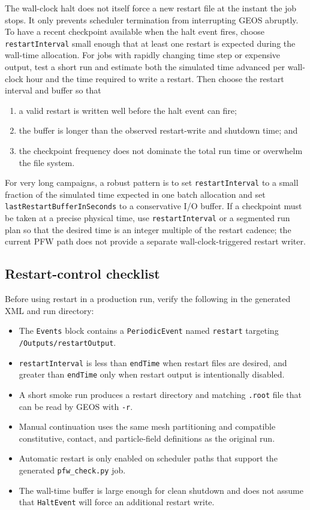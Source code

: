 The wall-clock halt does not itself force a new restart file at the instant the job stops.  It only prevents scheduler termination from interrupting GEOS abruptly.  To have a recent checkpoint available when the halt event fires, choose \texttt{restartInterval} small enough that at least one restart is expected during the wall-time allocation.  For jobs with rapidly changing time step or expensive output, test a short run and estimate both the simulated time advanced per wall-clock hour and the time required to write a restart.  Then choose the restart interval and buffer so that
\begin{enumerate}[leftmargin=*]
\item a valid restart is written well before the halt event can fire;
\item the buffer is longer than the observed restart-write and shutdown time; and
\item the checkpoint frequency does not dominate the total run time or overwhelm the file system.
\end{enumerate}

For very long campaigns, a robust pattern is to set \texttt{restartInterval} to a small fraction of the simulated time expected in one batch allocation and set \texttt{lastRestartBufferInSeconds} to a conservative I/O buffer.  If a checkpoint must be taken at a precise physical time, use \texttt{restartInterval} or a segmented run plan so that the desired time is an integer multiple of the restart cadence; the current PFW path does not provide a separate wall-clock-triggered restart writer.

\subsection{Restart-control checklist}
\label{sec:pfw-restart-checklist}

Before using restart in a production run, verify the following in the generated XML and run directory:
\begin{itemize}[leftmargin=*]
\item The \texttt{Events} block contains a \texttt{PeriodicEvent} named \texttt{restart} targeting \texttt{/Outputs/restartOutput}.
\item \texttt{restartInterval} is less than \texttt{endTime} when restart files are desired, and greater than \texttt{endTime} only when restart output is intentionally disabled.
\item A short smoke run produces a restart directory and matching \texttt{.root} file that can be read by GEOS with \texttt{-r}.
\item Manual continuation uses the same mesh partitioning and compatible constitutive, contact, and particle-field definitions as the original run.
\item Automatic restart is only enabled on scheduler paths that support the generated \texttt{pfw\_check.py} job.
\item The wall-time buffer is large enough for clean shutdown and does not assume that \texttt{HaltEvent} will force an additional restart write.
\end{itemize}

